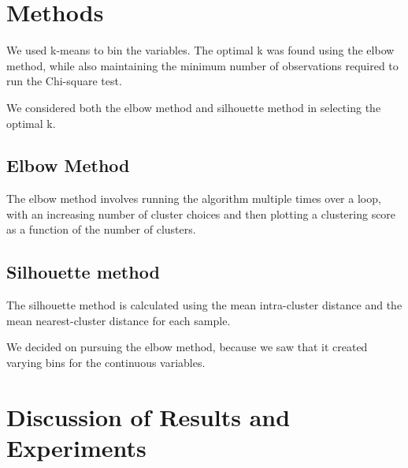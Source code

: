 \documentclass[15pt]{cup-pan}
\begin{document}
\begin{adjustwidth*}{-1.5in}{-0in}
\newpage 

\section{Methods}


We used k-means to bin the variables. The optimal k was found using the elbow method, while also maintaining the minimum number of observations required to run the 
Chi-square test. 

We considered both the elbow method and silhouette method in selecting the optimal k. 

\subsection{Elbow Method} 
The elbow method involves running the algorithm multiple times over a loop, with an increasing number of cluster choices and then plotting a clustering score as a function of the number of clusters. 


\subsection{Silhouette method}
The silhouette method is calculated using the mean intra-cluster distance and the mean nearest-cluster distance for each sample. 



\bigskip

\noindent We decided on pursuing the elbow method, because we saw that it created varying bins for the continuous variables. 



\bigskip

\newpage 

\section{Discussion of Results and Experiments}


\end{adjustwidth*}
\end{document}
